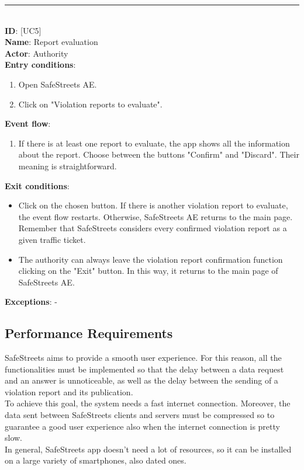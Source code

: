 \documentclass{article}
\newcommand\usecase[1]{ [UC#1] }
\begin{document}
				\rule{\linewidth}{0.4pt}
				\\
				
				\textbf{ID}: \usecase{5} \\
				\textbf{Name}: Report evaluation\\
				\textbf{Actor}: Authority\\
				\textbf{Entry conditions}:
				\begin{enumerate}
					\item Open SafeStreets AE.
					\item Click on "Violation reports to evaluate".
				\end{enumerate}
				\textbf{Event flow}:
				\begin{enumerate}
					\item If there is at least one report to evaluate, the app shows all the information about the report. Choose between the buttons "Confirm" and "Discard". Their meaning is straightforward.
				\end{enumerate}
				\textbf{Exit conditions}:
				\begin{itemize}
					\item Click on the chosen button. If there is another violation report to evaluate, the event flow restarts. Otherwise, SafeStreets AE returns to the main page. Remember that SafeStreets considers every confirmed violation report as a given traffic ticket.
					\item The authority can always leave the violation report confirmation function clicking on the "Exit" button. In this way, it returns to the main page of SafeStreets AE.
				\end{itemize}
				\textbf{Exceptions}: -\\

		\subsection{Performance Requirements}
			SafeStreets aims to provide a smooth user experience. For this reason, all the functionalities must be implemented so that the delay between a data request and an answer is unnoticeable, as well as the delay between the sending of a violation report and its publication.\\
			To achieve this goal, the system needs a fast internet connection. Moreover, the data sent between SafeStreets clients and servers must be compressed so to guarantee a good user experience also when the internet connection is pretty slow.\\
			In general, SafeStreets app doesn't need a lot of resources, so it can be installed on a large variety of smartphones, also dated ones.
\end{document}
